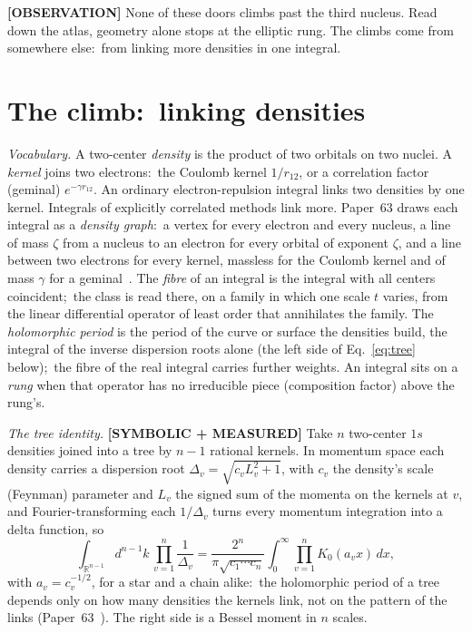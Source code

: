 \documentclass[aps,pra,twocolumn,superscriptaddress,longbibliography]{revtex4-2}
\begin{document}
\textbf{[OBSERVATION]} None of these doors climbs past the third
nucleus.  Read down the atlas, geometry alone stops at the elliptic
rung.  The climbs come from somewhere else:\ from linking more densities
in one integral.

\section{The climb:\ linking densities}
\label{sec:climb}

\emph{Vocabulary.}  A two-center \emph{density} is the product of two
orbitals on two nuclei.  A \emph{kernel} joins two electrons:\ the
Coulomb kernel $1/r_{12}$, or a correlation factor (geminal)
$e^{-\gamma r_{12}}$.  An ordinary electron-repulsion integral links two
densities by one kernel.  Integrals of explicitly correlated methods link
more.  Paper~63 draws each integral as a \emph{density graph}:\ a vertex
for every electron and every nucleus, a line of mass $\zeta$ from a
nucleus to an electron for every orbital of exponent $\zeta$, and a line
between two electrons for every kernel, massless for the Coulomb kernel
and of mass $\gamma$ for a geminal~\cite{loutey_paper63}.  The
\emph{fibre} of an integral is the integral with all centers coincident;\
the class is read there, on a family in which one scale $t$ varies, from
the linear differential operator of least order that annihilates the
family.  The \emph{holomorphic period} is the period of the curve or
surface the densities build, the integral of the inverse dispersion roots
alone (the left side of Eq.~\eqref{eq:tree} below);\ the fibre of the
real integral carries further weights.  An integral sits on a
\emph{rung} when that operator has no irreducible piece (composition
factor) above the rung's.

\emph{The tree identity.}  \textbf{[SYMBOLIC + MEASURED]} Take $n$
two-center $1s$ densities joined into a tree by $n-1$ rational kernels.
In momentum space each density carries a dispersion root
$\Delta_v=\sqrt{c_vL_v^2+1}$, with $c_v$ the density's scale (Feynman)
parameter and $L_v$ the signed sum of the momenta on the kernels at $v$,
and Fourier-transforming each $1/\Delta_v$
turns every momentum integration into a delta function, so
\begin{equation}
  \int_{\mathbb{R}^{n-1}}\! d^{n-1}k\,\prod_{v=1}^{n}\frac{1}{\Delta_v}
  = \frac{2^{n}}{\pi\sqrt{c_1\cdots c_n}}
    \int_0^\infty \prod_{v=1}^{n} K_0(a_v x)\,dx ,
  \label{eq:tree}
\end{equation}
with $a_v=c_v^{-1/2}$, for a star and a chain alike:\ the holomorphic
period of a tree depends only on how many densities the kernels link, not
on the pattern of the links (Paper~63~\cite{loutey_paper63}).  The right
side is a Bessel moment in $n$ scales.
\end{document}
